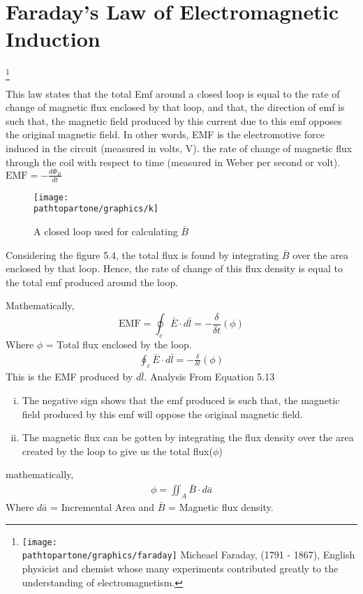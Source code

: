 
\section{Faraday's Law of Electromagnetic Induction} 
\footnote{
\texttt{[image: \\pathtopartone/graphics/faraday]} 
Micheael Faraday, (1791 - 1867), English physicist and chemist whose many experiments contributed greatly to the understanding of electromagnetism.
}

This law states that the total Emf around a closed loop is equal to the rate of change of magnetic flux enclosed by that loop, and that, the direction of emf is such that, the magnetic field produced by this current due to this emf opposes the original magnetic field.
In other words, EMF is the electromotive force induced in the circuit (measured in volts, V). the rate of change of magnetic flux through the coil with respect to time (measured in Weber per second or volt).
$\text{EMF} = -\frac{d\Phi_B}{dt}
$\begin{figure}[h]
\centering
\texttt{[image: \\pathtopartone/graphics/k]}
\caption{A closed loop used for calculating $\bar{B}$}
\label{fig:k}
\end{figure}

Considering the figure 5.4, the total flux is found by integrating $\bar{B}$ over the area enclosed by that loop. Hence, the rate of change of this flux density is equal to the total emf produced around the loop.

Mathematically,
\begin{dmath}
\text{EMF} = \oint_c\bar{E} \cdot d\bar{l} = -\frac{\delta}{\delta t}(\phi)
\end{dmath}
Where $\phi$ = Total flux enclosed by the loop.
\begin{align}
\boxed{\oint_c\bar{E} \cdot d\bar{l} = -\frac{\delta}{\delta t}(\phi)}
\end{align}
This is the EMF produced by\emph{ $d\bar{l}$}. Analysis From Equation 5.13
\begin{enumerate}[(i)]
\item The negative sign shows that the emf produced is such that, the magnetic field produced by this emf will oppose the original magnetic field. 
\item The magnetic flux can be gotten by integrating the flux density over the area created by the loop to give us the total flux($\phi$) 
\end{enumerate}
mathematically,
\begin{align}
\phi = \iint_A\bar{B} \cdot d\bar{a}
\end{align}
Where $d\bar{a}$ = Incremental Area and $\bar{B}$ = Magnetic flux density.

